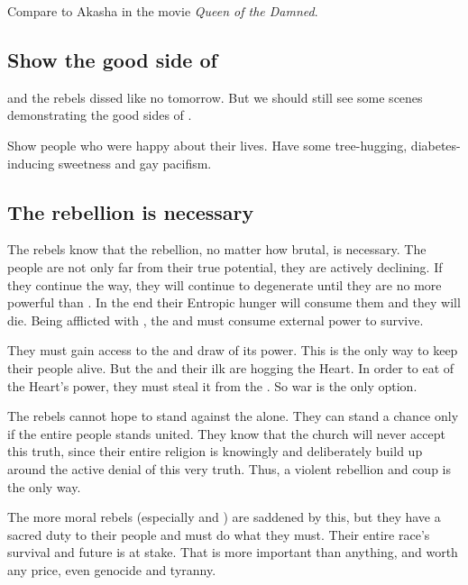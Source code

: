Compare to Akasha in the movie \emph{Queen of the Damned}. 









\subsection{Show the good side of \Merkyrah}
\Semiza{} and the rebels dissed \Merkyrah{} like no tomorrow. 
But we should still see some scenes demonstrating the good sides of \Merkyrah. 

Show people who were happy about their lives. 
Have some tree-hugging, diabetes-inducing sweetness and gay pacifism. 









\subsection{The rebellion is necessary}
The rebels know that the rebellion, no matter how brutal, is necessary. 
The \resphan{} people are not only far from their true potential, they are actively declining. 
If they continue the \Merkyran{} way, they will continue to degenerate until they are no more powerful than \humans. 
In the end their Entropic hunger will consume them and they will die. 
Being afflicted with \Bane{} , the  and must consume external power to survive. 

They must gain access to the  and draw of its power. 
This is the only way to keep their people alive. 
But the \dragons{} and their ilk are hogging the Heart. 
In order to eat of the Heart's power, they must steal it from the \dragons. 
So war is the only option. 

The rebels cannot hope to stand against the \dragons{} alone. 
They can stand a chance only if the entire \resphan{} people stands united. 
They know that the \Merkyran{} church will never accept this truth, since their entire religion is knowingly and deliberately build up around the active denial of this very truth. 
Thus, a violent rebellion and coup is the only way. 

The more moral rebels (especially \Damiarch{} and \Sithiyacaan) are saddened by this, but they have a sacred duty to their people and must do what they must. 
Their entire race's survival and future is at stake. 
That is more important than anything, and worth any price, even genocide and tyranny. 


